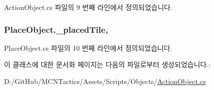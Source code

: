 Action\+Object.\+cs 파일의 9 번째 라인에서 정의되었습니다.

\subsubsection[{\texorpdfstring{\+\_\+placed\+Tile}{_placedTile}}]{ Place\+Object.\+\_\+placed\+Tile\hspace{0.3cm}{\ttfamily [protected]}, {\ttfamily [inherited]}}\hypertarget{class_place_object_a2006d9f7ffcf8aba6f731ebfc9b0af35}{}\label{class_place_object_a2006d9f7ffcf8aba6f731ebfc9b0af35}


Place\+Object.\+cs 파일의 10 번째 라인에서 정의되었습니다.



이 클래스에 대한 문서화 페이지는 다음의 파일로부터 생성되었습니다.\+:\begin{DoxyCompactItemize}
\item 
D\+:/\+Git\+Hub/\+M\+C\+N\+Tactics/\+Assets/\+Scripts/\+Objects/\hyperlink{_action_object_8cs}{Action\+Object.\+cs}\end{DoxyCompactItemize}
